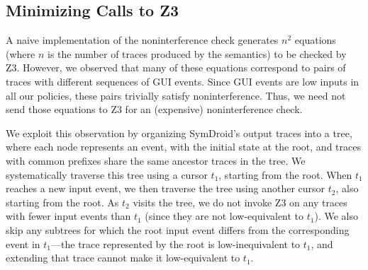 \documentclass[10pt,conference,compsocconf]{IEEEtran}
\newcommand{\comment}[3][\color{red}]{{#1{[{#2}: {#3}]}}}
\newcommand{\kris}[1]{\comment[\color{orange}]{kris}{#1}}
\begin{document}

\subsection{Minimizing Calls to Z3}

A naive implementation of the noninterference check generates $n^2$
equations (where $n$ is the number of traces produced by the semantics)
to be checked by Z3. However, we observed that many of these equations
correspond to pairs of traces with different sequences of GUI
events. Since GUI events are low inputs in all our policies, these
pairs trivially satisfy noninterference. Thus, we need not send those
equations to Z3 for an (expensive) noninterference check.

We exploit this observation by organizing SymDroid's output traces
into a tree, where each node represents an event, with
the initial state at the root, and traces with common prefixes share the
same ancestor traces in the tree. We systematically traverse this tree
using a cursor $t_1$, starting from the root. When $t_1$ reaches a new
input event, we then traverse the tree using another cursor $t_2$,
also starting from the root. As $t_2$ visits the tree, we do not
invoke Z3 on any traces with fewer input events than $t_1$ (since they
are not low-equivalent to $t_1$). We also skip any subtrees for
which the root input event differs from the corresponding event in
$t_1$---the trace represented by the root is low-inequivalent to $t_1$,
and extending that trace cannot make it low-equivalent to $t_1$.

\end{document}
